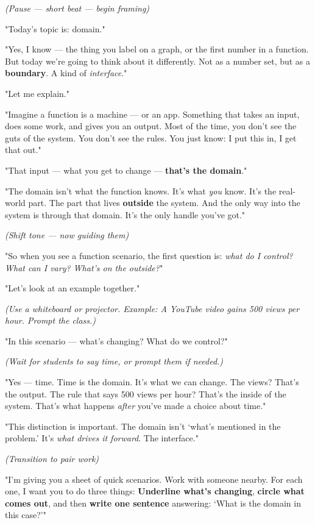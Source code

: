 \documentclass[12pt]{article}
\begin{document}
\textit{(Pause — short beat — begin framing)}

"Today’s topic is: domain."

"Yes, I know — the thing you label on a graph, or the first number in a function. But today we’re going to think about it differently. Not as a number set, but as a \textbf{boundary}. A kind of \textit{interface}."

"Let me explain."

"Imagine a function is a machine — or an app. Something that takes an input, does some work, and gives you an output. Most of the time, you don’t see the guts of the system. You don’t see the rules. You just know: I put this in, I get that out."

"That input — what you get to change — \textbf{that’s the domain}."

"The domain isn’t what the function knows. It’s what \textit{you} know. It’s the real-world part. The part that lives \textbf{outside} the system. And the only way into the system is through that domain. It’s the only handle you’ve got."

\textit{(Shift tone — now guiding them)}

"So when you see a function scenario, the first question is: \textit{what do I control? What can I vary? What’s on the outside?}"

"Let’s look at an example together."

\textit{(Use a whiteboard or projector. Example: A YouTube video gains 500 views per hour. Prompt the class.)}

"In this scenario — what’s changing? What do we control?"

\textit{(Wait for students to say \textit{time}, or prompt them if needed.)}

"Yes — time. Time is the domain. It’s what we can change. The views? That’s the output. The rule that says 500 views per hour? That’s the inside of the system. That’s what happens \textit{after} you’ve made a choice about time."

"This distinction is important. The domain isn’t ‘what’s mentioned in the problem.’ It’s \textit{what drives it forward}. The interface."

\textit{(Transition to pair work)}

"I’m giving you a sheet of quick scenarios. Work with someone nearby. For each one, I want you to do three things: \textbf{Underline what’s changing}, \textbf{circle what comes out}, and then \textbf{write one sentence} answering: ‘What is the domain in this case?’"
\end{document}

